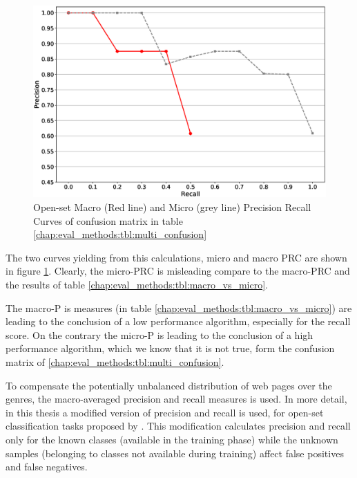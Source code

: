 \begin{figure}[t]
	\begin{center}
    	\includegraphics[scale=0.45]{Figures/pr_macro_micro_example.eps}
		\caption{Open-set Macro (Red line) and Micro (grey line) Precision Recall Curves of confusion matrix in table \ref{chap:eval_methods:tbl:multi_confusion}}
		\label{chap:eval_methods:fig:prc_macro}
	\end{center}
\end{figure}

The two curves yielding from this calculations, micro and macro PRC are shown in figure \ref{chap:eval_methods:fig:prc_macro}. Clearly, the micro-PRC is misleading compare to the macro-PRC and the results of table \ref{chap:eval_methods:tbl:macro_vs_micro}. 

The macro-P is measures (in table \ref{chap:eval_methods:tbl:macro_vs_micro}) are leading to the conclusion of a low performance algorithm, especially for the recall score. On the contrary the micro-P is leading to the conclusion of a high performance algorithm, which we know that it is not true, form the confusion matrix of \ref{chap:eval_methods:tbl:multi_confusion}.

To compensate the potentially unbalanced distribution of web pages over the genres, the macro-averaged precision and recall measures is used. In more detail, in this thesis a modified version of precision and recall is used, for open-set classification tasks proposed by \parencite{mendesjunior2016}. This modification calculates precision and recall only for the known classes (available in the training phase) while the unknown samples (belonging to classes not available during training) affect false positives and false negatives.

